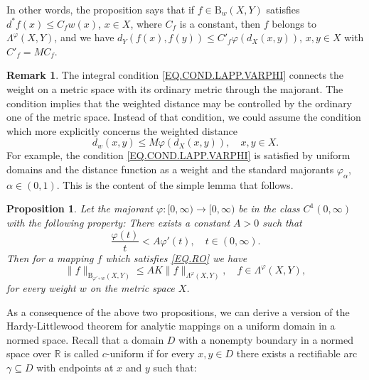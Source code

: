 \documentclass{amsart}
\newtheorem{proposition}[theorem]{Proposition}
\theoremstyle{definition}
\newtheorem{remark}[theorem]{Remark}
\numberwithin{equation}{section}
\begin{document}
In other words, the proposition says that if $f\in \mathrm {B}_w (X,Y)$ satisfies $d ^\ast  f(x) \le C_f w(x)$, $x\in X$,
where $C_f$ is a constant, then $f$ belongs to $\Lambda^\varphi (X,Y)$, and we have
$d_Y(f(x), f(y))\le  {C}' _f \varphi (d_X(x,y))$,  $x, y\in X$ with ${C}'_f = M C_f $.

\begin{remark}
The integral condition \eqref{EQ.COND.LAPP.VARPHI} connects the weight on a metric space with its ordinary metric
through the majorant. The condition implies that the weighted distance may be controlled by the ordinary one of the
metric space. Instead of that condition, we could assume the condition which more explicitly concerns the weighted
distance 
\begin{equation*}
d_w (x,y) \le M \varphi ( d_X(x,y)),\quad x,y\in X.
\end{equation*}
For example, the condition \eqref{EQ.COND.LAPP.VARPHI} is satisfied by uniform domains and the distance function as
a weight and the standard majorants $\varphi_\alpha$, $\alpha \in (0,1)$. This is the content of the simple lemma
that follows.
\end{remark}

\begin{proposition}\label{PR.2}
Let the majorant $\varphi:[0,\infty)\to [0,\infty)$ be in the class $C^1 (0,\infty)$ with the following property:
There exists a constant $A>0$ such that
\begin{equation}\label{EQ.COND.A}
\frac  {\varphi (t)} {t} < A \varphi'(t), \quad t\in (0,\infty).
\end{equation}
Then for a  mapping $f$ which satisfies \eqref{EQ.RO} we have
\begin{equation*}
\|f\| _{\mathrm {B} _{\varphi'\circ w} (X,Y)}\le A K \|f\|_{\Lambda^\varphi(X,Y)},\quad f\in {\Lambda^\varphi(X,Y)},
\end{equation*} 
for every weight  $w$  on the metric space $X$.
\end{proposition}


As a consequence of the above two propositions, we can derive a version of the Hardy-Littlewood theorem for analytic
mappings on a uniform domain in a normed space. Recall that a domain $D$  with a nonempty boundary in a normed space
over $\mathbb{R}$ is called $c$-uniform if for every $x,y\in D$ there exists a rectifiable arc $\gamma\subseteq D$ with
endpoints at $x$ and $y$ such that:
\end{document}
